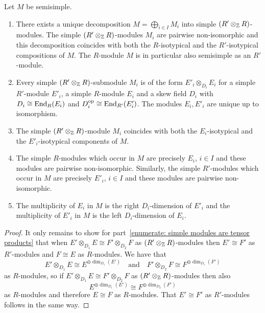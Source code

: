 \begin{theorem}
  \label{theorem: canonical decomposition of ss module}
  Let $M$ be semisimple.
  \begin{enumerate}
    \item
      There exists a unique decomposition $M  = \bigoplus_{i \in I} M_i$ into simple $(R' \otimes_{\mathbb{Z}} R)$-modules.
      The simple $(R' \otimes_{\mathbb{Z}} R)$-modules $M_i$ are pairwise non-isomorphic and this decomposition coincides with both the $R$-isotypical and the $R'$-isotypical compositions of $M$.
      The $R$-module $M$ is in particular also semisimple as an $R'$-module.
    \item
      \label{enumerate: simple modules are tensor products}
      Every simple $(R' \otimes_{\mathbb{Z}} R)$-submodule $M_i$ is of the form $E'_i \otimes_{D_i} E_i$ for a simple $R'$-module $E'_i$, a simple $R$-module $E_i$ and a skew field $D_i$ with $D_i \cong \operatorname{End}_R(E_i)$ and $D_i^{\operatorname{op}} \cong \operatorname{End}_{R'}(E'_i)$.
      The modules $E_i, E'_i$ are unique up to isomorphism.
    \item
      The simple $(R' \otimes_{\mathbb{Z}} R)$-module $M_i$ coincides with both the $E_i$-isotypical and the $E'_i$-isotypical components of $M$.
    \item
      The simple $R$-modules which occur in $M$ are precisely $E_i$, $i \in I$ and these modules are pairwise non-isomorphic.
      Similarly, the simple $R'$-modules which occur in $M$ are precisely $E'_i$, $i \in I$ and these modules are pairwise non-isomorphic.
    \item
      The multiplicity of $E_i$ in $M$ is the right $D_i$-dimension of $E'_i$ and the multiplicity of $E'_i$ in $M$ is the left $D_i$-dimension of $E_i$.
  \end{enumerate}
\end{theorem}


\begin{proof}
  It only remains to show for part~\ref*{enumerate: simple modules are tensor products} that when $E' \otimes_{D_1} E \cong F' \otimes_{D_2} F$ as $(R' \otimes_{\mathbb{Z}} R)$-modules then $E' \cong F'$ as $R'$-modules and $F \cong E$ as $R$-modules.
  We have that
  \[
          E' \otimes_{D_1} E
    \cong E^{\oplus \dim_{D_1}(E')}
    \quad\text{and}\quad
          F' \otimes_{D_2} F
    \cong F^{\oplus \dim_{D_1}(F')}
  \]
  as $R$-modules, so if $E' \otimes_{D_1} E \cong F' \otimes_{D_2} F$ as $(R' \otimes_{\mathbb{Z}} R)$-modules then also
  \[
          E^{\oplus \dim_{D_1}(E')}
    \cong F^{\oplus \dim_{D_2}(F')}
  \]
  as $R$-modules and therefore $E \cong F$ as $R$-modules.
  That $E' \cong F'$ as $R'$-modules follows in the same way.
\end{proof}


